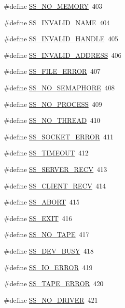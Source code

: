 \begin{DoxyCompactItemize}
\item 
\#define \hyperlink{group__err24_ga39da075b89b283b1ba6ee8163cd75e6d}{SS\_\-NO\_\-MEMORY}~403
\item 
\#define \hyperlink{group__err24_ga77e57c8c5c8a676e50f7b757294044f5}{SS\_\-INVALID\_\-NAME}~404
\item 
\#define \hyperlink{group__err24_ga43a0d1263dfc7b732dbb04271d8599c9}{SS\_\-INVALID\_\-HANDLE}~405
\item 
\#define \hyperlink{group__err24_ga8741bfc9d74c60db4d6978b337cfef93}{SS\_\-INVALID\_\-ADDRESS}~406
\item 
\#define \hyperlink{group__err24_ga25ab2ae4b1702824549b8e40a6e86718}{SS\_\-FILE\_\-ERROR}~407
\item 
\#define \hyperlink{group__err24_ga693cdd4ddba4919824025c1c7339e54d}{SS\_\-NO\_\-SEMAPHORE}~408
\item 
\#define \hyperlink{group__err24_ga45a5e45d0c1bb8ac8b23385a95ffd20d}{SS\_\-NO\_\-PROCESS}~409
\item 
\#define \hyperlink{group__err24_ga164e3fc92adb05840a3442728c181793}{SS\_\-NO\_\-THREAD}~410
\item 
\#define \hyperlink{group__err24_gabfc9c001ee2e4f077a312cf4cf820dfe}{SS\_\-SOCKET\_\-ERROR}~411
\item 
\#define \hyperlink{group__err24_ga4ceb5b10e3abde2c178d87192664044f}{SS\_\-TIMEOUT}~412
\item 
\#define \hyperlink{group__err24_ga3f947813c830bdf148673ad0c29e00f7}{SS\_\-SERVER\_\-RECV}~413
\item 
\#define \hyperlink{group__err24_gafe9fb1a199a6e53c4478a0fe83931986}{SS\_\-CLIENT\_\-RECV}~414
\item 
\#define \hyperlink{group__err24_ga136923b4499af07f13a3cd631b88ec0e}{SS\_\-ABORT}~415
\item 
\#define \hyperlink{group__err24_ga8bdfd6ab89f9628d57174f8a4287bf9f}{SS\_\-EXIT}~416
\item 
\#define \hyperlink{group__err24_ga9ac796b5448c9009c8135524ab4ede4e}{SS\_\-NO\_\-TAPE}~417
\item 
\#define \hyperlink{group__err24_gab33c355e9ba39a4bc024efc9c3bfdbbe}{SS\_\-DEV\_\-BUSY}~418
\item 
\#define \hyperlink{group__err24_gaba97d9c5175be9b9573f28e2bec7ec9c}{SS\_\-IO\_\-ERROR}~419
\item 
\#define \hyperlink{group__err24_ga1271b2092f57a1f2eab374deb5aa20e0}{SS\_\-TAPE\_\-ERROR}~420
\item 
\#define \hyperlink{group__err24_ga6d231194f11fe80cf351cab940212ead}{SS\_\-NO\_\-DRIVER}~421

\end{DoxyCompactItemize}
